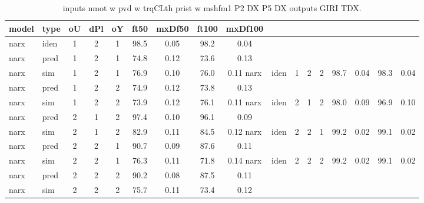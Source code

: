 \begin{center} 
\begin{longtable}{ll|ccc|cc|cc} 
\caption[inputs nmot w pvd w trqCLth prist w mshfm1 P2 DX P5 DX   outputs GIRI TDX]{inputs nmot w pvd w trqCLth prist w mshfm1 P2 DX P5 DX   outputs GIRI TDX.} 
\label{tab:inputs_nmot_w_pvd_w_trqCLth_prist_w_mshfm1_P2_DX_P5_DX___outputs_GIRI_TDX} 
\hline 
  model & type & oU & dPl & oY & ft50 & mxDf50 & ft100 & mxDf100 \\ 
 \hline 
narx & iden & 1 & 2 & 1 & 98.5 & 0.05 & 98.2 & 0.04 \\ 
narx & pred & 1 & 2 & 1 & 74.8 & 0.12 & 73.6 & 0.13 \\ 
narx & sim  & 1 & 2 & 1 & 76.9 & 0.10 & 76.0 & 0.11 
 \hline 
narx & iden & 1 & 2 & 2 & 98.7 & 0.04 & 98.3 & 0.04 \\ 
narx & pred & 1 & 2 & 2 & 74.9 & 0.12 & 73.8 & 0.13 \\ 
narx & sim  & 1 & 2 & 2 & 73.9 & 0.12 & 76.1 & 0.11 
 \hline 
narx & iden & 2 & 1 & 2 & 98.0 & 0.09 & 96.9 & 0.10 \\ 
narx & pred & 2 & 1 & 2 & 97.4 & 0.10 & 96.1 & 0.09 \\ 
narx & sim  & 2 & 1 & 2 & 82.9 & 0.11 & 84.5 & 0.12 
 \hline 
narx & iden & 2 & 2 & 1 & 99.2 & 0.02 & 99.1 & 0.02 \\ 
narx & pred & 2 & 2 & 1 & 90.7 & 0.09 & 87.6 & 0.11 \\ 
narx & sim  & 2 & 2 & 1 & 76.3 & 0.11 & 71.8 & 0.14 
 \hline 
narx & iden & 2 & 2 & 2 & 99.2 & 0.02 & 99.1 & 0.02 \\ 
narx & pred & 2 & 2 & 2 & 90.2 & 0.08 & 87.5 & 0.11 \\ 
narx & sim  & 2 & 2 & 2 & 75.7 & 0.11 & 73.4 & 0.12 
 \hline 
\end{longtable} 
\end{center}